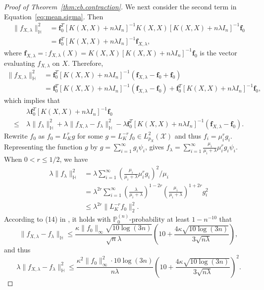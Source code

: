 \documentclass[12pt]{article}
\newcommand{\PP}{\mathbb{P}}
\newcommand{\bbH}{\mathbb{H}}
\newcommand{\mX}{\mathcal{X}}
\newcommand{\Ltwo}{L^2_{p_X}(\mX)}
\theoremstyle{plain}
\theoremstyle{nonitalicremark}
\begin{document}
\begin{appendices}
\begin{proof}[Proof of Theorem~\ref{thm:eb.contraction}]
We next consider the second term in Equation~\eqref{eq:mean.sigma}. Then 
\begin{align}
\|f_{X, \lambda}\|_{\bbH}^2 &= \bm f_0^T [K(X,X)+n\lambda I_n]^{-1} K(X, X) [K(X,X)+n\lambda I_n]^{-1} \bm f_0\\
&=  \bm f_0^T [K(X,X)+n\lambda I_n]^{-1} \bm f_{X, \lambda},
\end{align}
where $\bm f_{X, \lambda} =: f_{X, \lambda}(X) = K(X, X) [K(X,X)+n\lambda I_n]^{-1} \bm f_0$ is the vector evaluating $f_{X, \lambda}$ on $X$. 
Therefore, 
\begin{align}
\|f_{X, \lambda}\|_{\bbH}^2 & = \bm f_0^T [K(X,X)+n\lambda I_n]^{-1} (\bm f_{X, \lambda} - \bm f_0 + \bm f_0) \\
& = \bm f_0^T [K(X,X)+n\lambda I_n]^{-1} (\bm f_{X, \lambda} - \bm f_0) + \bm f_0^T [K(X,X)+n\lambda I_n]^{-1} \bm f_0,
\end{align}
which implies that
\begin{align}
&\ \lambda\bm f_0^T [K(X,X)+n\lambda I_n]^{-1} \bm f_0 \\
\label{eq:quadratic}\leq &\ \lambda\|f_\lambda\|_{\bbH}^2 + \lambda\|f_{X, \lambda} - f_\lambda \|_{\bbH}^2 - \lambda\bm f_0^T [K(X,X)+n\lambda I_n]^{-1} (\bm f_{X, \lambda} - \bm f_0).
\end{align}
Rewrite $f_0$ as $f_0=L_K^{r}g$ for some $g=L_K^{-r}f_0\in \Ltwo$ and thus $f_i=\mu_i^{r}g_i$. Representing the function $g$ by $g=\sum_{i=1}^{\infty}  g_i\psi_i$, gives $f_\lambda = \sum_{i=1}^{\infty} \frac{\mu_i}{\mu_i+\lambda}\mu_i^{r} g_i\psi_i$. When $0 <r\leq 1/2$, we have
\begin{align}
\lambda\|f_\lambda\|_\bbH^2&=\lambda\sum_{i=1}^{\infty} \left(\frac{\mu_i}{\mu_i+\lambda}\mu_i^{r} g_i\right)^2\bigg /\mu_i\\
&=\lambda^{2r}\sum_{i=1}^{\infty} \left(\frac{\lambda}{\mu_i+\lambda}\right)^{1-2r}\left(\frac{\mu_i}{\mu_i+\lambda}\right)^{1+2r}g_i^2\\
\label{eq:quadratic.1}&\leq \lambda^{2r}\|L_K^{-r}f_0\|^2_{2}.
\end{align}
According to (14) in \cite{liu2020non}, it holds with $\PP_0^{(n)}$-probability at least $1-n^{-10}$ that
\begin{equation}
\|f_{X,\lambda}-f_\lambda\|_\bbH\leq\frac{\kappa \|f_0\|_\infty \sqrt{10 \log(3n)}}{\sqrt{n}\lambda}  \left(10 + \frac{4 \kappa\sqrt{10 \log(3n)}}{3 \sqrt{n\lambda}} \right),
\end{equation}
and thus 
\begin{equation}
\label{eq:quadratic.2}\lambda\|f_{X,\lambda}-f_\lambda\|^2_\bbH\leq\frac{\kappa^2 \|f_0\|^2_\infty \cdot 10 \log(3n)}{n\lambda}  \left(10 + \frac{4 \kappa\sqrt{10 \log(3n)}}{3 \sqrt{n\lambda}} \right)^2.

\end{equation}
\end{proof}
\end{appendices}
\end{document}

